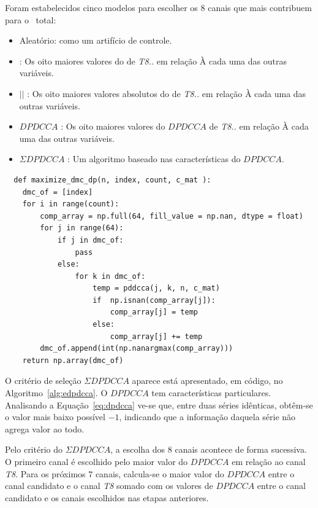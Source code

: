 Foram estabelecidos cinco modelos para escolher os 8 canais que mais contribuem para o \dmc~total:

\begin{itemize}
  \item Aleatório: como um artifício de controle.
  \item \pdcca : Os oito maiores valores do \pdcca de \emph{T8..} em relação À cada uma das outras variáveis.
  \item $|$\pdcca$|$ : Os oito maiores valores absolutos do \pdcca de \emph{T8..} em relação À cada uma das outras variáveis.
  \item $DPDCCA$ : Os oito maiores valores do $DPDCCA$ de \emph{T8..} em relação À cada uma das outras variáveis.
  \item $\Sigma DPDCCA$ : Um algoritmo baseado nas características do $DPDCCA$.  
\end{itemize}


\begin{algorithm} \caption{$\Sigma DPDCCA$} \label{alg:edpdcca}
  \begin{lstlisting}
  def maximize_dmc_dp(n, index, count, c_mat ):
    dmc_of = [index]
    for i in range(count):
        comp_array = np.full(64, fill_value = np.nan, dtype = float)
        for j in range(64):
            if j in dmc_of:
                pass
            else:
                for k in dmc_of:
                    temp = pddcca(j, k, n, c_mat)
                    if  np.isnan(comp_array[j]):
                        comp_array[j] = temp
                    else:
                        comp_array[j] += temp
        dmc_of.append(int(np.nanargmax(comp_array)))
    return np.array(dmc_of)

    \end{lstlisting}
\end{algorithm}

O critério de seleção $\Sigma DPDCCA$ aparece está apresentado, em código, no Algoritmo~\ref{alg:edpdcca}. O $DPDCCA$ tem características particulares. Analisando a Equação~\ref{eq:dpdcca} ve-se que, entre duas séries idênticas, obtêm-se o valor mais baixo possível $-1$, indicando que a informação daquela série não agrega valor ao todo.

Pelo critério do $\Sigma DPDCCA$, a escolha dos 8 canais acontece de forma sucessiva. O primeiro canal é escolhido pelo maior valor do $DPDCCA$ em relação ao canal \emph{T8}. Para os próximos $7$ canais, calcula-se o maior valor do $DPDCCA$ entre o canal candidato e o canal \emph{T8} somado com os valores de $DPDCCA$ entre o canal candidato e os canais escolhidos nas etapas anteriores.


